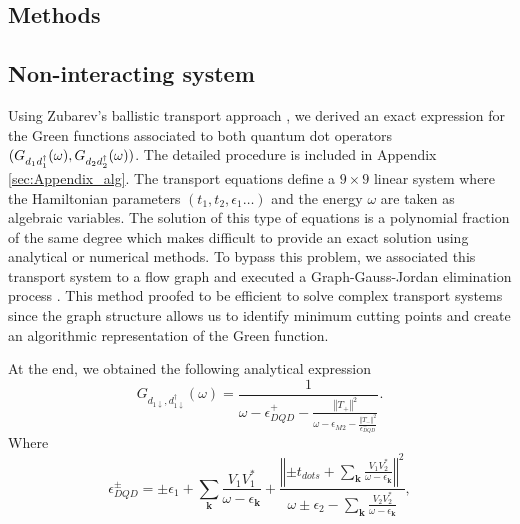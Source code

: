 \documentclass[showpacs,aps,prb,reprint,superscriptaddress]{revtex4-1}
\begin{document}
\subsection{Methods}

\subsection{Non-interacting system \label{sec:non-interactingMethods}}

Using Zubarev's ballistic transport approach \cite{zubarev_double-time_1960}, we derived an exact expression for the Green functions associated to both quantum dot operators $(G_{d_1d^\dagger_1}(\omega),G_{d_2d^\dagger_2}(\omega))$.  The detailed procedure is included in Appendix \ref{sec:Appendix_alg}. The transport equations define a $9 \times 9$ linear system where the Hamiltonian parameters $(t_1,t_2,\epsilon_1 \ldots)$ and the energy $\omega$ are taken as algebraic variables. The solution of this type of equations is a polynomial fraction of the same degree which makes difficult to provide an exact solution using analytical or numerical methods. To bypass this problem, we associated this transport system to a flow graph and executed a Graph-Gauss-Jordan elimination process \cite{spielman_algorithms_2010}.  This method proofed to be efficient to solve complex transport systems since the graph structure allows us to identify minimum cutting points  and create an algorithmic representation of the Green function. 


At the end, we obtained the following analytical expression
\begin{equation}
    G_{{d_{1\downarrow},d_{1\downarrow}^{\dagger}}}\left(\omega\right)=\frac{1}{\omega-\epsilon_{DQD}^{+}-\frac{\left\Vert T_{+}\right\Vert ^{2}}{\omega-\epsilon_{M2}-\frac{\left\Vert T_{-}\right\Vert ^{2}}{\epsilon_{DQD}^{-}}}}.
    \label{eq:Green_NonInteracting}
\end{equation}
\noindent Where
\begin{equation}
    \epsilon_{DQD}^{\pm}=\pm\epsilon_{1}+\sum_{\mathbf{k}}\frac{V_{1}V_{1}^{*}}{\omega-\epsilon_{\mathbf{k}}}+\frac{\left\Vert \pm t_{dots}+\sum_{\mathbf{k}}\frac{V_{1}V_{2}^{*}}{\omega-\epsilon_{\mathbf{k}}}\right\Vert ^{2}}{\omega\pm\epsilon_{2}-\sum_{\mathbf{k}}\frac{V_{2}V_{2}^{*}}{\omega-\epsilon_{\mathbf{k}}}}, \label{eq:epDQD}
\end{equation}
\noindent 
\end{document}
